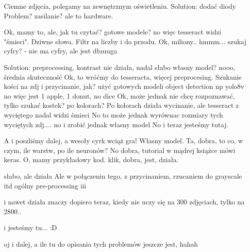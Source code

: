 Ciemne zdjęcia, polegamy na zewnętrznym oświetleniu.
Solution: dodać diody
Problem? zasilanie? ale to hardware.

Ok, mamy to, ale, jak tu czytać? gotowe modele?
no więc tesseract widzi "śmieci". Dziwne słowa.
Filtr na liczby i do przodu.
Ok, miliony.. hmmm...
szukaj cyfry? - nie ma cyfry, ale jest dłuuuga

Solution: preprocessing.
kontrast
nie działa, nadal słabo
własny model?
nooo, średnia skuteczność
Ok, to wróćmy do tesseracta, więcej preprocesing.
Szukanie kości na zdj i przycinanie, jak?
użyć gotowych modeli object detection np yolo8v
no więc jest 1 apple, 1 donut, no dice
Ok, może jednak nie chcę rozpoznawać, tylko szukać kostek?
po kolorach?
Po kolorach działa wycinanie, ale tesseract z wyciętego nadal widzi śmieci
No to może jednak wyrównac rozmiary tych wyciętych zdj.... no i zrobić jednak własny model
No i teraz jesteśmy tutaj.

A i poszliśmy dalej, a wesoły cyrk wciąż gra!
Własny model. Ta, dobra, to co, w czym, ile warstw, po ile neuronów?
No dobra, tutorial w mądrej książce mówi keras.
O, mamy przykładowy kod.
klik, dobra, jest, działa.

słabo, ale działa
Ale w połączeniu tego, z przycinaniem, rzucaniem do grayscale itd ogólny pre-processing iii

i nawet działa
znaczy dopiero teraz, kiedy nie uczy się na 300 zdjęciach, tylko na 2800..

i jesteśmy tu... :D

oj i dalej, a ile tu do opisania tych problemów jeszcze jest, hahah



